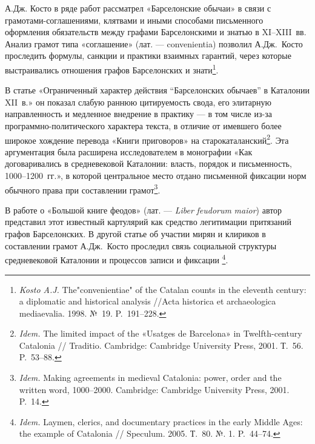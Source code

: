 А.Дж. Косто в ряде работ рассматрел «Барселонские обычаи» в связи с грамотами-соглашениями, клятвами и иными способами письменного оформления обязательств между графами Барселонскими и знатью в XI--XIII~вв.\textbf{ }Анализ грамот типа «соглашение» (лат. --- convenientia) позволил А.Дж.~Косто проследить формулы, санкции и практики взаимных гарантий, через которые выстраивались отношения графов Барселонских и знати\footnote{\emph{Kosto A.J.} The"convenientiae" of the Catalan counts in the eleventh century: a diplomatic and historical analysis //Acta historica et archaeologica mediaevalia. 1998. №~19. P.~191--228.}.

В статье «Ограниченный характер действия “Барселонских обычаев” в Каталонии XII~в.» он показал слабую раннюю цитируемость свода, его элитарную направленность и медленное внедрение в практику --- в том числе из-за программно-политического характера текста, в отличие от имевшего более широкое хождение перевода «Книги приговоров» на старокаталанский\footnote{\emph{Idem.} The limited impact of the «Usatges de Barcelona» in Twelfth-century Catalonia // Traditio. Cambridge: Cambridge University Press, 2001. Т.~56. P.~53--88.}. Эта аргументация была расширена исследователем в монографии «Как договаривались в средневековой Каталонии: власть, порядок и письменность, 1000--1200~гг.», в которой центральное место отдано письменной фиксации норм обычного права при составлении грамот\footnote{\emph{Idem.} Making agreements in medieval Catalonia: power, order and the written word, 1000--2000. Cambridge: Cambridge University Press, 2001. P.~14.}.

В работе о «Большой книге феодов» (лат. --- \emph{Liber}\emph{ }\emph{feudorum}\emph{ }\emph{maior}) автор представил этот известный картулярий как средство легитимации притязаний графов Барселонских. В другой статье об участии мирян и клириков в составлении грамот А.Дж.~Косто проследил связь социальной структуры средневековой Каталонии и процессов записи и фиксации \footnote{\emph{Idem.} Laymen, clerics, and documentary practices in the early Middle Ages: the example of Catalonia // Speculum. 2005. Т.~80. №. 1. P.~44--74.}.

